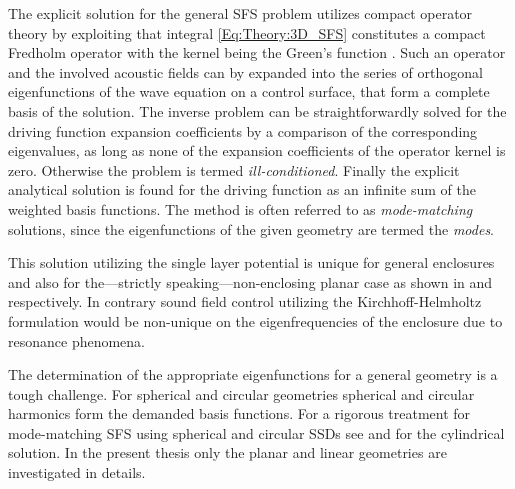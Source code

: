 The explicit solution for the general SFS problem utilizes compact operator theory by exploiting that integral \eqref{Eq:Theory:3D_SFS} constitutes a compact Fredholm operator with the kernel being the Green's function \cite{Ahrens2012,MorseFeshbach1953}.
Such an operator and the involved acoustic fields can by expanded into the series of orthogonal eigenfunctions of the wave equation on a control surface, that form a complete basis of the solution.
The inverse problem can be straightforwardly solved for the driving function expansion coefficients by a comparison of the corresponding eigenvalues, as long as none of the expansion coefficients of the operator kernel is zero.
Otherwise the problem is termed \emph{ill-conditioned}.
Finally the explicit analytical solution is found for the driving function as an infinite sum of the weighted basis functions.
The method is often referred to as \emph{mode-matching} solutions, since the eigenfunctions of the given geometry are termed the \emph{modes}.

This solution utilizing the single layer potential is unique for general enclosures and also for the---strictly speaking---non-enclosing planar case as shown in \cite{Zotter2013:uniqueness} and \cite{Fazi2010} respectively. In contrary sound field control utilizing the Kirchhoff-Helmholtz formulation would be non-unique on the eigenfrequencies of the enclosure due to resonance phenomena.

The determination of the appropriate eigenfunctions for a general geometry is a tough challenge.
For spherical and circular geometries spherical and circular harmonics form the demanded basis functions. For a rigorous treatment for mode-matching SFS using spherical and circular SSDs see \cite{Ahrens2010phd,Zotter2009phd,Ahrens2012,Ahrens2009:circularSSD_mismatch,Ahrens2009:circular25D_SFR,Ahrens2008:Analytical_Circ_Spherical_SFS,Schultz2014:Comparing_approaches} and \cite{Koyama2014} for the cylindrical solution.
In the present thesis only the planar and linear geometries are investigated in details.
 
